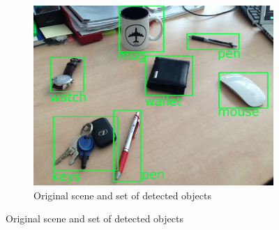 \documentclass[conference]{IEEEtran}
\begin{document}
	
	\begin{figure}[th!]
		\center
		\begin{subfigure}{0.8\columnwidth}
			\includegraphics[width=\columnwidth]{img/map_original.jpg}
			\caption{Original scene and set of detected objects}
			\label{fig:object-detection}
		\end{subfigure}
		

\end{figure}
\end{document}
